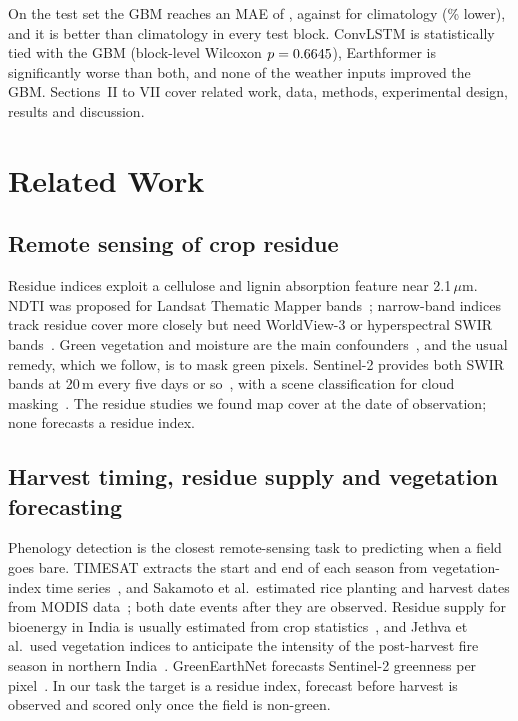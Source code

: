 \documentclass[journal]{IEEEtran}
\begin{document}
On the test set the GBM reaches an MAE of \finGbmMAE, against \finClimMAE{} for climatology (\finxGbmRelMAEVsClim\% lower), and it is better than climatology in every test block. ConvLSTM is statistically tied with the GBM (block-level Wilcoxon $p=0.6645$), Earthformer is significantly worse than both, and none of the weather inputs improved the GBM. Sections~II to VII cover related work, data, methods, experimental design, results and discussion.

\section{Related Work}
\subsection{Remote sensing of crop residue}
Residue indices exploit a cellulose and lignin absorption feature near 2.1\,$\mu$m. NDTI was proposed for Landsat Thematic Mapper bands~\cite{vandeventer}; narrow-band indices track residue cover more closely but need WorldView-3 or hyperspectral SWIR bands~\cite{hively}. Green vegetation and moisture are the main confounders~\cite{zheng,quemada}, and the usual remedy, which we follow, is to mask green pixels. Sentinel-2 provides both SWIR bands at 20\,m every five days or so~\cite{sentinel}, with a scene classification for cloud masking~\cite{sen2cor}. The residue studies we found map cover at the date of observation; none forecasts a residue index.

\subsection{Harvest timing, residue supply and vegetation forecasting}
Phenology detection is the closest remote-sensing task to predicting when a field goes bare. TIMESAT extracts the start and end of each season from vegetation-index time series~\cite{timesat}, and Sakamoto et al.\ estimated rice planting and harvest dates from MODIS data~\cite{sakamoto}; both date events after they are observed. Residue supply for bioenergy in India is usually estimated from crop statistics~\cite{hiloidhari}, and Jethva et al.\ used vegetation indices to anticipate the intensity of the post-harvest fire season in northern India~\cite{jethva}. GreenEarthNet forecasts Sentinel-2 greenness per pixel~\cite{greenearthnet}. In our task the target is a residue index, forecast before harvest is observed and scored only once the field is non-green.
\end{document}
